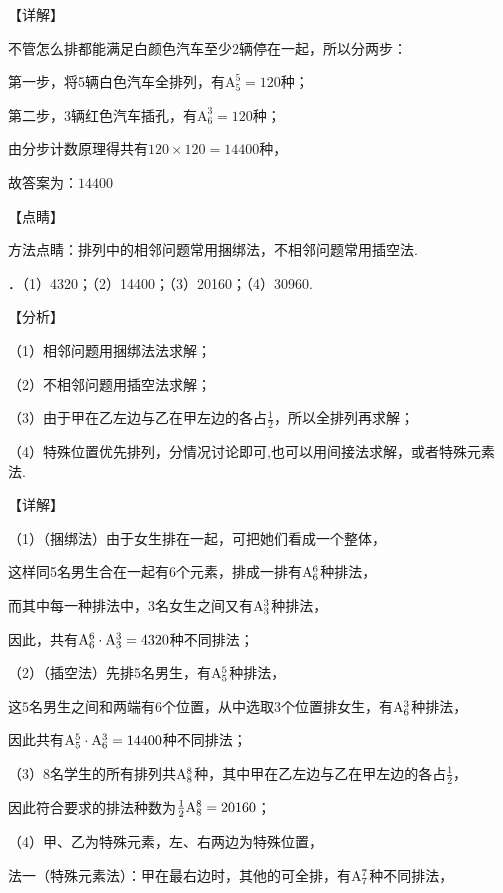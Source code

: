 \noindent 【详解】

\noindent 不管怎么排都能满足白颜色汽车至少2辆停在一起，所以分两步：

\noindent 第一步，将5辆白色汽车全排列，有$\mathrm A_{5}^{5} =120$种；

\noindent 第二步，3辆红色汽车插孔，有$\mathrm A_{6}^{3} =120$种；

\noindent 由分步计数原理得共有$120\times 120=14400$种，

\noindent 故答案为：$14400$

\noindent 【点睛】

\noindent 方法点睛：排列中的相邻问题常用捆绑法，不相邻问题常用插空法.

．（1）4320；（2）14400；（3）20160；（4）30960.

\noindent 【分析】

\noindent （1）相邻问题用捆绑法法求解；

\noindent （2）不相邻问题用插空法求解；

\noindent （3）由于甲在乙左边与乙在甲左边的各占$\frac{1}{2} $，所以全排列再求解；

\noindent （4）特殊位置优先排列，分情况讨论即可,也可以用间接法求解，或者特殊元素法.

\noindent 【详解】

\noindent （1）（捆绑法）由于女生排在一起，可把她们看成一个整体，

\noindent 这样同5名男生合在一起有6个元素，排成一排有${\rm A}_{6}^{6} $种排法，

\noindent 而其中每一种排法中，3名女生之间又有${\rm A}_{3}^{3} $种排法，

\noindent 因此，共有${\rm A}_{6}^{6} \cdot {\rm A}_{3}^{3} =4320$种不同排法；

\noindent （2）（插空法）先排5名男生，有${\rm A}_{5}^{5} $种排法，

\noindent 这5名男生之间和两端有6个位置，从中选取3个位置排女生，有${\rm A}_{6}^{3} $种排法，

\noindent 因此共有${\rm A}_{5}^{5} \cdot {\rm A}_{6}^{3} =14400$种不同排法；

\noindent （3）8名学生的所有排列共${\rm A}_{8}^{8} $种，其中甲在乙左边与乙在甲左边的各占$\frac{1}{2} $，

\noindent 因此符合要求的排法种数为$\frac{1}{2} {\rm A}_{8}^{8} =20160$；

\noindent （4）甲、乙为特殊元素，左、右两边为特殊位置，

\noindent 法一（特殊元素法）：甲在最右边时，其他的可全排，有${\rm A}_{7}^{7} $种不同排法，

